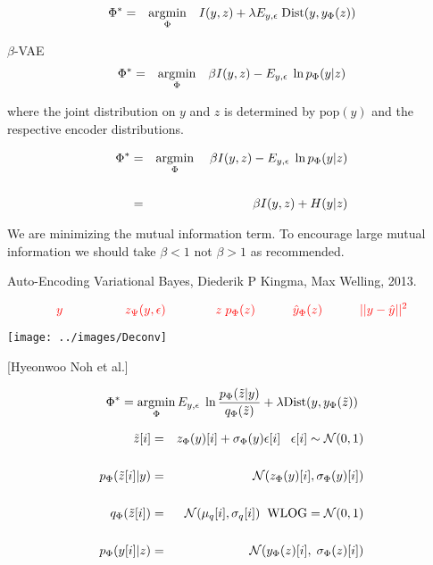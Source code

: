 {\begin{eqnarray*}
\Phi^* & = & \operatorname*{argmin}_\Phi \;\;\; I(y,z) + \lambda E_{y,\epsilon}\; \mathrm{Dist}(y, y_\Phi(z))
\end{eqnarray*}

\vfill
$\beta$-VAE
\begin{eqnarray*}
\Phi^* & = & \operatorname*{argmin}_\Phi \;\;\; \beta I(y,z) - E_{y,\epsilon}\;\ln p_\Phi(y|z)
\end{eqnarray*}

\vfill
where the joint distribution on $y$ and $z$ is determined by $\mathrm{pop}(y)$ and the respective encoder distributions.


\begin{eqnarray*}
\Phi^* & = & \operatorname*{argmin}_\Phi \;\;\;\;\beta I(y,z) -  E_{y,\epsilon}\;\ln p_\Phi(y|z) \\
\\
& = & \beta I(y,z) + H(y|z)
\end{eqnarray*}

\vfill
We are minimizing the mutual information term.  To encourage large mutual information we should take $\beta < 1$ not $\beta > 1$ as recommended.


Auto-Encoding Variational Bayes, Diederik P Kingma, Max Welling, 2013.

\vfill
$${\color{red}y \hspace{5em}  z_\Psi(y,\epsilon) \hspace{4em} z\;p_\Phi(z) \hspace{3em} \hat{y}_\Phi(z) \hspace{3em}||y - \hat{y}||^2}$$
\centerline{\texttt{[image: ../images/Deconv]}}

\centerline{\Large [Hyeonwoo Noh et al.]}


$$\Phi^* = \operatorname*{argmin}_\Phi E_{y,\epsilon}\;\ln \frac{p_\Phi(\tilde{z}|y)}{q_\Phi(\tilde{z})} + \lambda \mathrm{Dist}(y,y_\Phi(\tilde{z}))$$

{\color{red}
\begin{eqnarray*}
\tilde{z}[i] & = & z_\Phi(y)[i] + \sigma_\Phi(y)\epsilon[i]\;\;\;\epsilon[i] \sim {\cal N}(0,1) \\
\\
p_\Phi(\tilde{z}[i]|y) & = & {\cal N}(z_\Phi(y)[i],\sigma_\Phi(y)[i]) \\
\\
q_\Phi(\tilde{z}[i]) & = & {\cal N}(\mu_q[i],\sigma_q[i]) \;\;\mbox{WLOG} = {\cal N}(0,1) \\
\\
p_\Phi(y[i]|z) & = & {\cal N}(y_\Phi(z)[i],\;\sigma_\Phi(z)[i])
\end{eqnarray*}
}

}
